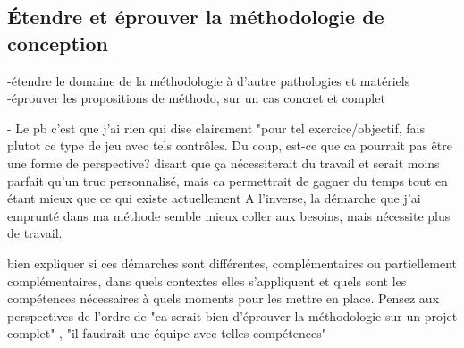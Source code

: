 	\subsection{Étendre et éprouver la méthodologie de conception}
	-étendre le domaine de la méthodologie à d'autre pathologies et matériels\newline
	-éprouver les propositions de méthodo, sur un cas concret et complet\newline
	
	- Le pb c'est que j'ai rien qui dise clairement "pour tel exercice/objectif, fais plutot ce type de jeu avec tels contrôles. Du coup, est-ce que ca pourrait pas être une forme de perspective? disant que ça nécessiterait du travail et serait moins parfait qu'un truc personnalisé, mais ca permettrait de gagner du temps tout en étant mieux que ce qui existe actuellement
	A l'inverse, la démarche que j'ai emprunté dans ma méthode semble mieux coller aux besoins, mais nécessite plus de travail.
 
 bien expliquer si ces démarches sont différentes, complémentaires ou partiellement complémentaires, dans quels contextes elles s'appliquent et quels sont les compétences nécessaires à quels moments pour les mettre en place.
 Pensez aux perspectives de l'ordre de "ca serait bien d'éprouver la méthodologie sur un projet complet" , "il faudrait une équipe avec telles compétences"